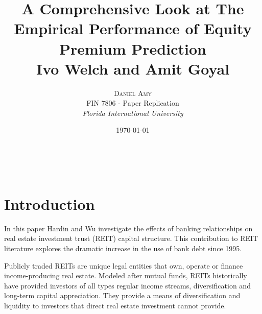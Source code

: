\documentclass[a4paper, 12pt]{article} %
\title{\textbf{{{\Large A Comprehensive Look at The Empirical Performance of Equity Premium Prediction}}}\\ %
{\normalsize Ivo Welch and Amit Goyal}} %
\author{\textsc{Daniel Amy} %
\\{\small FIN 7806 - Paper Replication}
\\{\textit{Florida International University}}} %
\date{\today} %
\makeatletter
\renewcommand{\maketitle}{ %
\begin{flushright} %
{\LARGE\@title} %

\vspace{40pt} %

{\large\@author} %
\\\@date %

\vspace{30pt} %
\end{flushright}
}
\makeatother
\begin{document}
\maketitle %




%
%



\section*{Introduction}
\doublespacing

In this paper Hardin and Wu investigate the effects of banking relationships on real estate investment trust (REIT) capital structure. This contribution to REIT literature explores the dramatic increase in the use of bank debt since 1995.

Publicly traded REITs are unique legal entities that own, operate or finance income-producing real estate. Modeled after mutual funds, REITs historically have provided investors of all types regular income streams, diversification and long-term capital appreciation. They provide a means of diversification and liquidity to investors that direct real estate investment cannot provide.
\end{document}
